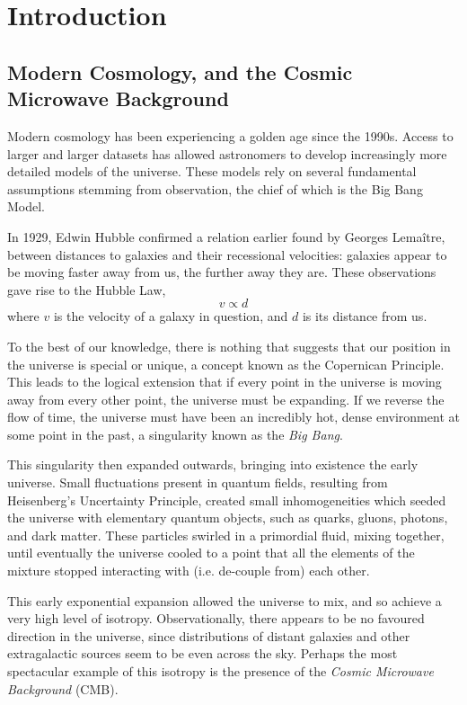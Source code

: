 \chapter{Introduction}
\section{Modern Cosmology, and the Cosmic Microwave Background}
Modern cosmology has been experiencing a golden age since the 1990s. Access to larger and larger datasets has allowed astronomers to develop increasingly more detailed models of the universe. These models rely on several fundamental assumptions stemming from observation, the chief of which is the Big Bang Model. 
\par In 1929, Edwin Hubble confirmed a relation earlier found by Georges Lemaître, between  distances to galaxies and their recessional velocities: galaxies appear to be moving faster away from us, the further away they are. These observations gave rise to the Hubble Law,
\begin{equation}
	v  \varpropto d
	\label{eq:HubbleLaw}
\end{equation}
where $v$ is the velocity of a galaxy in question, and $d$ is its distance from us. 
\par To the best of our knowledge, there is nothing that suggests that our position in the universe is special or unique, a concept known as the Copernican Principle. This leads to the logical extension that if every point in the universe is moving away from every other point, the universe must be expanding. If we reverse the flow of time, the universe must have been an incredibly hot, dense environment at some point in the past, a singularity known as the \emph{Big Bang}.
\par This singularity then expanded outwards, bringing into existence the early universe. Small fluctuations present in quantum fields, resulting from Heisenberg's Uncertainty Principle, created small inhomogeneities which seeded the universe with elementary quantum objects, such as quarks, gluons, photons, and dark matter. These particles swirled in a primordial fluid, mixing together, until eventually the universe cooled to a point that all the elements of the mixture stopped interacting with (i.e. de-couple from) each other. 
\par This early exponential expansion allowed the universe to mix, and so achieve a very high level of isotropy. Observationally, there appears to be no favoured direction in the universe, since distributions of distant galaxies and other extragalactic sources seem to be even across the sky. Perhaps the most spectacular example of this isotropy is the presence of the \emph{Cosmic Microwave Background} (CMB).
